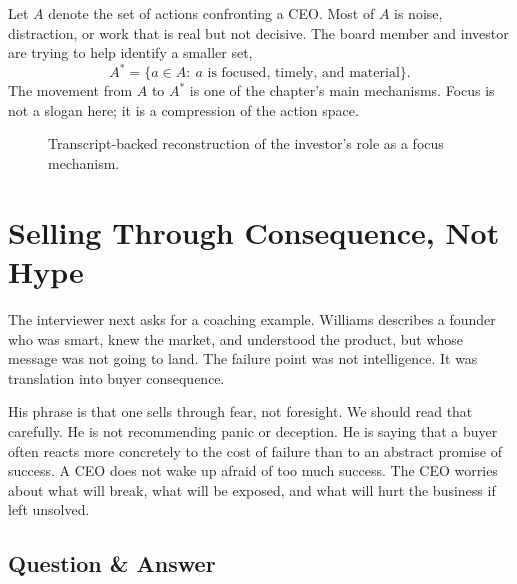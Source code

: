 Let \(A\) denote the set of actions confronting a CEO. Most of \(A\) is noise, distraction, or work that is real but not decisive. The board member and investor are trying to help identify a smaller set,
\begin{equation}
A^\ast
=
\{a \in A:\ a \text{ is focused, timely, and material}\}.
\end{equation}
The movement from \(A\) to \(A^\ast\) is one of the chapter's main mechanisms. Focus is not a slogan here; it is a compression of the action space.

\begin{figure}
\centering
{}
\caption{Transcript-backed reconstruction of the investor's role as a focus mechanism.}
\end{figure}

\section{Selling Through Consequence, Not Hype}

The interviewer next asks for a coaching example. Williams describes a founder who was smart, knew the market, and understood the product, but whose message was not going to land. The failure point was not intelligence. It was translation into buyer consequence.

His phrase is that one sells through fear, not foresight. We should read that carefully. He is not recommending panic or deception. He is saying that a buyer often reacts more concretely to the cost of failure than to an abstract promise of success. A CEO does not wake up afraid of too much success. The CEO worries about what will break, what will be exposed, and what will hurt the business if left unsolved.

\subsection{Question \& Answer}

